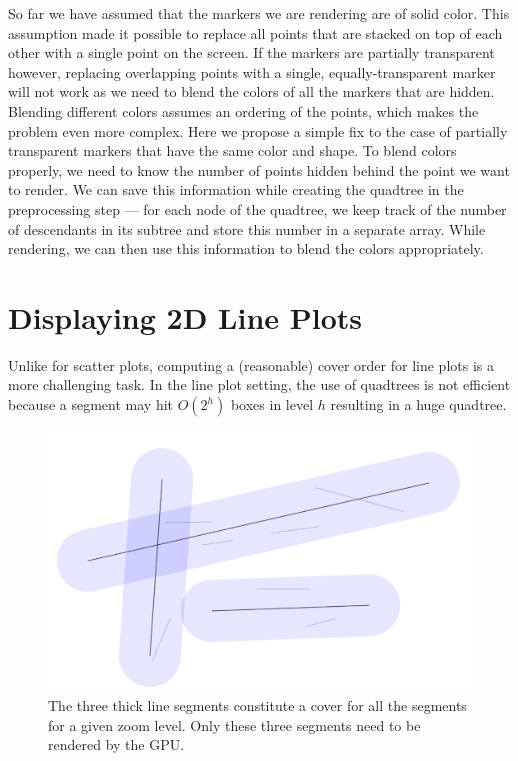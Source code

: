 \documentclass[11pt,a4paper]{article}
\begin{document}
So far we have assumed that the markers we are rendering are of solid color. 
This assumption made it possible to replace all points that are stacked on top of each other 
with a single point on the screen.
If the markers are partially transparent however, replacing overlapping points with a single, equally-transparent marker
will not work as we need to blend the colors of all the markers that are hidden. 
Blending different colors assumes an ordering of the points, which makes the problem even more complex.
Here we propose a simple fix to the case of partially transparent markers that have the same color and shape. 
To blend colors properly, we need to know the number of points hidden behind the point we want to render. 
We can save this information while creating the quadtree in the preprocessing step --- for each 
node of the quadtree, we keep track of the number of descendants in its subtree and 
store this number in a separate array. 
While rendering, we can then use this information to blend the colors appropriately. 




\section{Displaying 2D Line Plots}
Unlike for scatter plots, computing a (reasonable) cover order for line plots is a more challenging task.
In the line plot setting, the use of quadtrees is not efficient because a segment may hit $O(2^h)$ boxes in level $h$
resulting in a huge quadtree. 


\begin{figure}[hbt]
  \begin{center}
    \includegraphics[scale=0.15]{lineplot-cover.png}
    \caption{The three thick line segments constitute a cover for all the segments for a given zoom level. Only these three segments need to be rendered by the GPU.}
    \label{quad}
  \end{center}
\end{figure}
\end{document}
